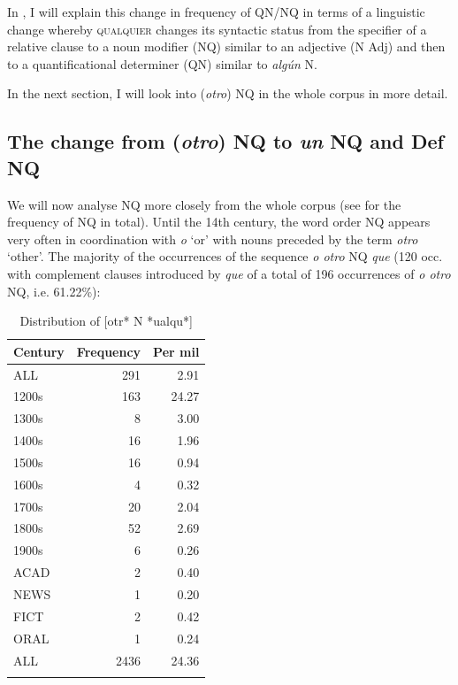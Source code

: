 In , I will explain this change in frequency of QN/NQ in terms of a linguistic change whereby \textsc{qualquier} changes its syntactic status from the specifier of a relative clause to a noun modifier (NQ) similar to an adjective (N Adj) and then to a quantificational determiner (QN) similar to \textit{algún} N.

In the next section, I will look into (\textit{otro}) NQ in the whole corpus in  more detail.

\subsection{{The} {change} {from} {(\textit{otro}}{) }{NQ} {to} {\textit{un} }{NQ }{and} {Def} {NQ}} \label{sec:5.2.2}

We will now analyse NQ more closely from the whole corpus (see  for the frequency of NQ in total). Until the 14th century, the word order NQ appears very often in coordination with \textit{o} ‘or’ with nouns preceded by the term \textit{otro} ‘other’. The majority of the occurrences of the sequence \textit{o otro} NQ \textit{que} (120 occ. with complement clauses introduced by \textit{que} of a total of 196 occurrences of \textit{o otro} NQ, i.e. 61.22\%):

\begin{table}
\begin{tabular}{lrr}
    \lsptoprule
Century &  Frequency &    Per mil\\
    \midrule
    {ALL} & 291 & 2.91 \\
    {1200s} & 163 & 24.27 \\
    {1300s} & 8 & 3.00 \\
    {1400s} & 16 & 1.96 \\
    {1500s} & 16 & 0.94 \\
    {1600s} & 4 & 0.32 \\
    {1700s} & 20 & 2.04 \\
    {1800s} & 52 & 2.69 \\
    {1900s} & 6 & 0.26 \\
    \midrule
    {ACAD} & 2 & 0.40 \\
    {NEWS} & 1 & 0.20 \\
    {FICT} & 2 & 0.42 \\
    {ORAL} & 1 & 0.24 \\
    \midrule
     {ALL} & 2436 & 24.36 \\
    \lspbottomrule
\end{tabular}
\caption{\label{tab:distribution} Distribution of [otr* N *ualqu*]}
\end{table}

